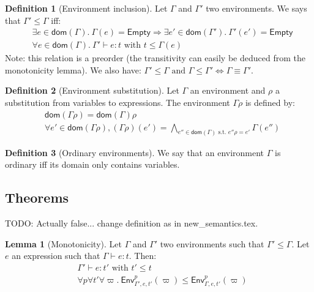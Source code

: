 \documentclass[a4paper]{article}%
\newcommand{\dom}[1]{\textsf{dom}(#1)}
\newcommand{\Empty} {\textsf{Empty}}%
\newcommand{\Gp}[2]{\textsf{Env}^{#1}_{#2}}
\theoremstyle{definition}
\newtheorem{lemma}{Lemma}
\newtheorem{definition}{Definition}
\begin{document}
  \begin{definition}[Environment inclusion]
    Let $\Gamma$ and $\Gamma'$ two environments. We says that $\Gamma' \leq \Gamma$ iff:
    \begin{align*}
      &\exists e\in \dom \Gamma.\ \Gamma(e)=\Empty \Rightarrow \exists e'\in \dom {\Gamma'}.\ \Gamma'(e')=\Empty\\
      &\forall e \in \dom \Gamma.\ \Gamma' \vdash e : t \text{ with } t \leq \Gamma(e)
    \end{align*}
    Note: this relation is a preorder (the transitivity can easily be deduced from the monotonicity lemma).
    We also have: $\Gamma' \leq \Gamma \text{ and } \Gamma \leq \Gamma' \Leftrightarrow \Gamma \equiv \Gamma'$.
  \end{definition}

  \begin{definition}[Environment substitution]
    Let $\Gamma$ an environment and $\rho$ a substitution from variables to expressions.
    The environment $\Gamma\rho$ is defined by:
    \begin{align*}
      &\dom {\Gamma\rho} = \dom \Gamma \rho\\
      &\forall e' \in \dom {\Gamma\rho}, (\Gamma\rho)(e') = \bigwedge_{e'' \in \dom \Gamma \text{ s.t. } e''\rho=e'}\Gamma(e'')
    \end{align*}
  \end{definition}

  \begin{definition}[Ordinary environments]
    We say that an environment $\Gamma$ is ordinary iff its domain only contains variables.
  \end{definition}

    \subsection{Theorems}

    TODO: Actually false... change definition as in new_semantics.tex.
    \begin{lemma}[Monotonicity]
      Let $\Gamma$ and $\Gamma'$ two environments such that $\Gamma' \leq \Gamma$. Let $e$ an expression such that $\Gamma \vdash e:t$.
      Then:\\
      \begin{align*}
        &\Gamma' \vdash e:t' \text{ with } t' \leq t\\
        &\forall p \forall t' \forall \varpi.\ \Gp p {\Gamma',e,t'} (\varpi) \leq \Gp p {\Gamma,e,t'} (\varpi)
      \end{align*}
    \end{lemma}
\end{document}
